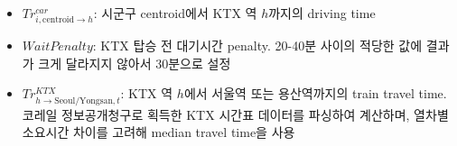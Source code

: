 \documentclass[a4paper, 10pt]{article}
\begin{document}
\begin{itemize}
\begin{itemize}
                    \item $Tr^{car}_{i,\text{centroid}\rightarrow h}$: 시군구 centroid에서 KTX 역 $h$까지의
                        driving time
                    \item $WaitPenalty$: KTX 탑승 전 대기시간 penalty.
                        20-40분 사이의 적당한 값에 결과가 크게 달라지지 않아서 30분으로 설정
                    \item $Tr^{KTX}_{h\rightarrow\text{Seoul/Yongsan},t}$: KTX 역 $h$에서
                        서울역 또는 용산역까지의 train travel time. 코레일 정보공개청구로 획득한
                        KTX 시간표 데이터를 파싱하여 계산하며, 열차별 소요시간 차이를 고려해
                        median travel time을 사용
                \end{itemize}
        \end{itemize}
\end{document}

